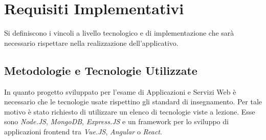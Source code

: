 	\section{Requisiti Implementativi}
	
	    Si definiscono i vincoli a livello tecnologico e di implementazione che sarà necessario rispettare nella realizzazione dell'applicativo.
	
	    \subsection{Metodologie e Tecnologie Utilizzate}
	        In quanto progetto sviluppato per l'esame di Applicazioni e Servizi Web è necessario che le tecnologie usate rispettino gli standard di insegnamento. Per tale motivo è stato richiesto di utilizzare un elenco di tecnologie viste a lezione. Esse sono \textit{Node.JS}, \textit{MongoDB}, \textit{Express.JS} e un framework per lo sviluppo di applicazioni frontend tra \textit{Vue.JS}, \textit{Angular} o \textit{React}.